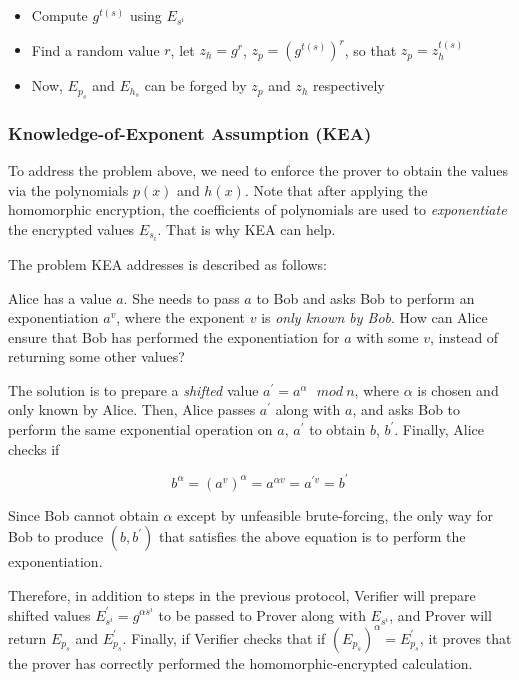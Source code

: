 \documentclass[
]{report}
\begin{document}
\begin{itemize}
\item
  Compute \(g^{t(s)}\) using \(E_{s^{i}}\)
\item
  Find a random value \(r\), let \(z_{h} = g^{r}\),
  \(z_{p} = \left( g^{t(s)} \right)^{r}\), so that
  \(z_{p} = z_{h}^{t(s)}\)
\item
  Now, \(E_{p_{s}}\) and \(E_{h_{s}}\) can be forged by \(z_{p}\) and
  \(z_{h}\) respectively
\end{itemize}

\subsubsection{Knowledge-of-Exponent Assumption (KEA)}

To address the problem above, we need to enforce the prover to obtain
the values via the polynomials \(p(x)\) and \(h(x)\). Note that after
applying the homomorphic encryption, the coefficients of polynomials are
used to \emph{exponentiate} the encrypted values \(E_{s_{i}}\). That is
why KEA can help.

The problem KEA addresses is described as follows:

Alice has a value \(a\). She needs to pass \(a\) to Bob and asks Bob to
perform an exponentiation \(a^{v}\), where the exponent \(v\) is
\emph{only known by Bob}. How can Alice ensure that Bob has performed
the exponentiation for \(a\) with some \(v\), instead of returning some
other values?

The solution is to prepare a \emph{shifted} value
\(a^{'} = a^{\alpha}\ \ \ mod\ n\), where \(\alpha\) is chosen and only
known by Alice. Then, Alice passes \(a^{'}\) along with \(a\), and asks
Bob to perform the same exponential operation on \(a\), \(a^{'}\) to
obtain \(b\), \(b^{'}\). Finally, Alice checks if

\[b^{\alpha} = \left( a^{v} \right)^{\alpha} = a^{\alpha v} = a^{'v} = b^{'}\]

Since Bob cannot obtain \(\alpha\) except by unfeasible brute-forcing,
the only way for Bob to produce \(\left( b,b^{'} \right)\) that
satisfies the above equation is to perform the exponentiation.

Therefore, in addition to steps in the previous protocol, Verifier will
prepare shifted values \(E_{s^{i}}^{'} = g^{\alpha s^{i}}\) to be passed
to Prover along with \(E_{s^{i}}\), and Prover will return \(E_{p_{s}}\)
and \(E_{p_{s}}^{'}\). Finally, if Verifier checks that if
\(\left( E_{p_{s}} \right)^{\alpha} = E_{p_{s}}^{'}\), it proves that
the prover has correctly performed the homomorphic-encrypted
calculation.
\end{document}
